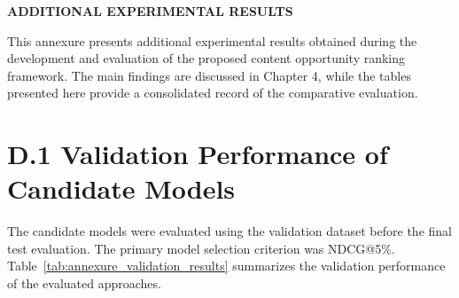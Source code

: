 \documentclass[12pt,a4paper]{report}
\begin{document}

\begin{center}
    \textbf{\Large ADDITIONAL EXPERIMENTAL RESULTS}
\end{center}

\vspace{0.5cm}

This annexure presents additional experimental results obtained during the development and evaluation of the proposed content opportunity ranking framework. The main findings are discussed in Chapter 4, while the tables presented here provide a consolidated record of the comparative evaluation.

\section*{D.1 Validation Performance of Candidate Models}

The candidate models were evaluated using the validation dataset before the final test evaluation. The primary model selection criterion was NDCG@5\%. Table~\ref{tab:annexure_validation_results} summarizes the validation performance of the evaluated approaches.

\begin{table}[htbp]
\centering
\caption{Validation Performance of Candidate Models}
\label{tab:annexure_validation_results}
\renewcommand{\arraystretch}{1.3}
\end{table}
\end{document}
